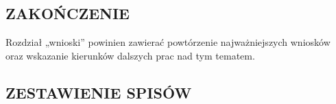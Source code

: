 \documentclass[12pt]{article}
\begin{document}
\subsection*{ZAKOŃCZENIE}
Rozdział „wnioski” powinien zawierać powtórzenie najważniejszych wniosków oraz wskazanie kierunków dalszych prac nad tym tematem.

\newpage


\newpage


\printbibliography[title ={BIBLIOGRAFIA}]

\newpage

\subsection*{ZESTAWIENIE SPISÓW}

\listoftables

\listoffigures

\newpage


\newpage
\end{document}
